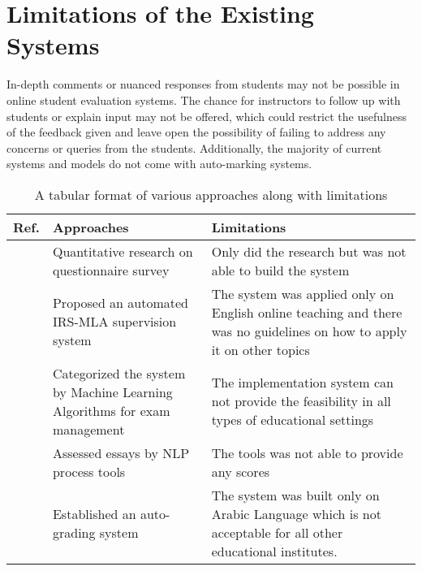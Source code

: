 \section{Limitations of the Existing Systems}
In-depth comments or nuanced responses from students may not be possible in online student evaluation systems. The chance for instructors to follow up with students or explain input may not be offered, which could restrict the usefulness of the feedback given and leave open the possibility of failing to address any concerns or queries from the students. Additionally, the majority of current systems and models do not come with auto-marking systems.
\begin{table}[H]
\centering
\caption{A tabular format of various approaches along with limitations\\}

\begin{tabular}{ p{.5cm} p{5.5cm} p{7.5cm} } 
\hline
Ref. & Approaches & Limitations \\
\hline
[4] & Quantitative research on questionnaire survey  & Only did the research but was not able to build the system  \\ 
\hline
[9] & Proposed an automated IRS-MLA supervision system & The system was applied only on English online teaching and there was no guidelines on how to apply it on other topics\\ 
\hline
[10] & Categorized the system by Machine Learning Algorithms for exam management & The implementation system can not provide the feasibility in all types of educational settings \\ 
\hline
[15] & Assessed essays by NLP process tools & The tools was not able to provide any scores \\ 
\hline
\cite{shehab2018automatic} & Established an auto-grading system & The system was built only on Arabic Language which is not acceptable for all other educational institutes.\\
\hline
\end{tabular}
\label{table2.1}
\end{table}
